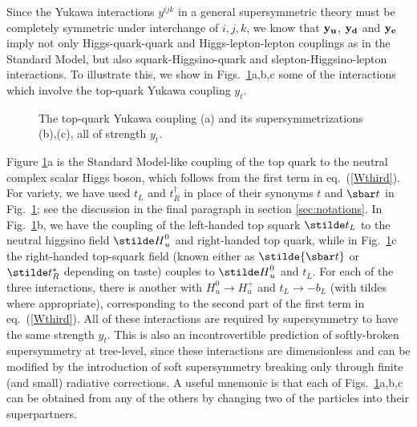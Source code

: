 Since the Yukawa interactions $y^{ijk}$ in a general
supersymmetric theory must be completely symmetric under interchange
of $i,j,k$, we know that ${\bf y_u}$, ${\bf y_d}$ and ${\bf y_e}$
imply not only Higgs-quark-quark and
Higgs-lepton-lepton couplings as in the Standard Model, but also
squark-Higgsino-quark and slepton-Higgsino-lepton interactions.
To illustrate this,
we show in Figs.~{\ref{fig:topYukawa}}a,b,c some of the
interactions which
involve the top-quark Yukawa coupling $y_t$.
\begin{figure}
\centerline{}
\caption{The top-quark Yukawa coupling (a) and its supersymmetrizations
(b),(c), all of strength $y_t$.
\label{fig:topYukawa}}
\end{figure}
Figure \ref{fig:topYukawa}a is the Standard Model-like coupling
of the top quark to the neutral complex scalar Higgs boson,
which follows from
the first term in eq.~(\ref{Wthird}).
For variety, we have used $t_L$ and
$t_R^\dagger$ in place of their
synonyms $t$ and $\sbar t$ in Fig.~\ref{fig:topYukawa};
see the discussion in the final paragraph in section
\ref{sec:notations}.
In Fig.~\ref{fig:topYukawa}b, we have the coupling of the left-handed
top squark $\stilde t_L$ to the neutral higgsino field ${\stilde H}_u^0$
and right-handed top quark,
while in Fig.~\ref{fig:topYukawa}c the right-handed
top-squark field
(known either as $\stilde {\sbar t}$ or $\stilde t_R^*$ depending on
taste) couples to ${\stilde H}^0_u$ and $t_L$.
For each of the three interactions, there is another with
$H_u^0\rightarrow H_u^+$ and $t_L \rightarrow -b_L$ (with tildes where
appropriate), corresponding to
the second part of the first term in eq.~(\ref{Wthird}).
All of these interactions are required by supersymmetry to have
 the same strength $y_t$.
This is also an
incontrovertible prediction of softly-broken supersymmetry at tree-level,
since these interactions are dimensionless and can be modified
by the introduction of soft supersymmetry breaking only through
finite (and small) radiative corrections.
A useful mnemonic is that each of Figs.~{\ref{fig:topYukawa}}a,b,c can be
obtained from any of
the others by changing two of the particles into their superpartners.

